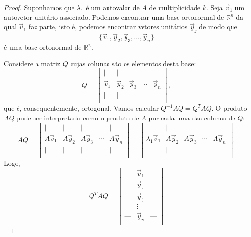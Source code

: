 \documentclass[../livro.tex]{subfiles}
\begin{document}
\begin{proof}
	Suponhamos que $\lambda_1$ é um autovalor de $A$ de multiplicidade $k$. Seja $\vec{v}_1$ um autovetor unitário associado. Podemos encontrar uma base ortonormal de $\mathbb{R}^n$ da qual $\vec{v}_1$ faz parte, isto é, podemos encontrar vetores unitários $\vec{y}_j$ de modo que
	\begin{equation}
	\{ \vec{v}_1, \vec{y}_2, \vec{y}_3, \dots, \vec{y}_n \}
	\end{equation} é uma base ortonormal de $\mathbb{R}^n$.
	
	Considere a matriz $Q$ cujas colunas são os elementos desta base:
	\begin{equation}
	Q = 
	\begin{bmatrix}
	| & | & | & & | \\
	\vec{v}_1 & \vec{y}_2 & \vec{y}_3 & \cdots &  \vec{y}_n \\
	| & | & | & & | \\
	\end{bmatrix},
	\end{equation} que é, consequentemente, ortogonal. Vamos calcular $Q^{-1} A Q = Q^T A Q$. O produto $AQ$ pode ser interpretado como o produto de $A$ por cada uma das colunas de $Q$:
	\begin{equation}
	AQ = 
	\begin{bmatrix}
	| & | & | & & | \\
	A \vec{v}_1 & A \vec{y}_2 & A \vec{y}_3 & \cdots &  A\vec{y}_n \\
	| & | & | & & | \\
	\end{bmatrix} = 
	\begin{bmatrix}
	| & | & | & & | \\
	\lambda_1 \vec{v}_1 & A \vec{y}_2 & A \vec{y}_3 & \cdots &  A\vec{y}_n \\
	| & | & | & & | \\
	\end{bmatrix}.
	\end{equation} Logo,
	\begin{equation}
	Q^TAQ =
	\begin{bmatrix}
	\text{---} & \vec{v}_1 & \text{---} \\
	\text{---} & \vec{y}_2 & \text{---} \\
	\text{---} & \vec{y}_3 &\text{---} \\
	& \vdots    &     \\
	\text{---} & \vec{y}_n & \text{---} \\      

\end{bmatrix}
\end{equation}
\end{proof}
\end{document}
